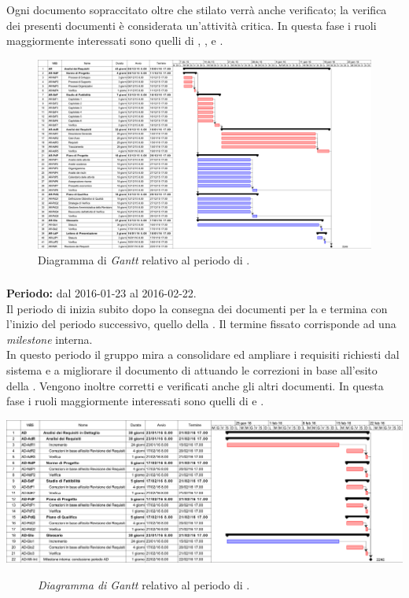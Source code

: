 Ogni documento sopraccitato oltre che stilato verrà anche verificato; la verifica dei presenti documenti è considerata un'attività critica.
In questa fase i ruoli maggiormente interessati sono quelli di \textit{\Amm}, \textit{\Res}, \textit{\Ana} e \textit{\Ver}. 
\begin{figure}
	\centering
	\includegraphics[keepaspectratio = true, width=23cm]{immagini/PdP_AnalisiDeiRequisitiGantt.png}
	\caption{Diagramma di \textit{Gantt} relativo al periodo di \AR.}\label{etichetta}
\end{figure}
\newpage

\subsubsection{\AD}
\textbf{Periodo:} dal 2016-01-23 al 2016-02-22. \\
Il periodo di \AD inizia subito dopo la consegna dei documenti per la \RR e termina con l'inizio del periodo successivo, quello della \PA. Il termine fissato corrisponde ad una \textit{milestone} interna. \\
In questo periodo il gruppo mira a consolidare ed ampliare i requisiti richiesti dal sistema e a migliorare il documento di \textit{\AdR} attuando le correzioni in base all'esito della \RR.
Vengono inoltre corretti e verificati anche gli altri documenti. 
In questa fase i ruoli maggiormente interessati sono quelli di \textit{\Ana} e \textit{\Ver}.  
\begin{center}
	\includegraphics[keepaspectratio = true, width=16cm]{immagini/PdP_AnalisiDeiRequisitiInDettaglioGantt.png}
\end{center}
\begin{figure}[h]
	\caption{\textit{Diagramma di Gantt} relativo al periodo di \AD.}\label{etichetta}
\end{figure}

